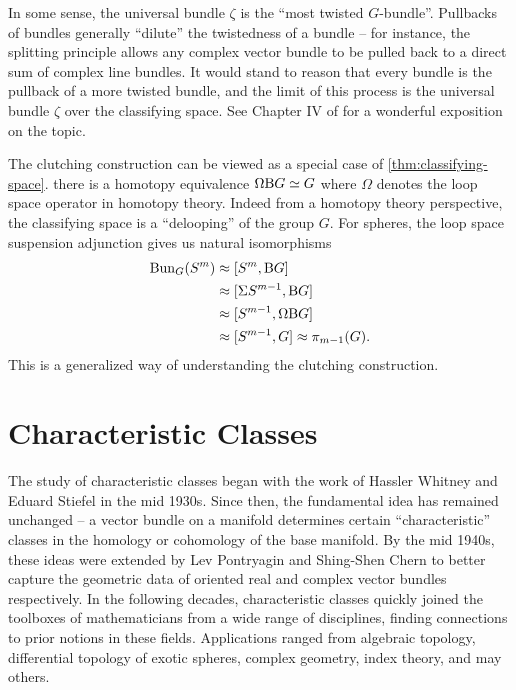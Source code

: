 	In some sense, the universal bundle $\zeta$ is the ``most twisted $G$-bundle''. Pullbacks of bundles generally ``dilute'' the twistedness of a bundle -- for instance, the splitting principle allows any complex vector bundle to be pulled back to a direct sum of complex line bundles. It would stand to reason that every bundle is the pullback of a more twisted bundle, and the limit of this process is the universal bundle $\zeta$ over the classifying space. See Chapter IV of \cite{botttu1982differential} for a wonderful exposition on the topic.


	\begin{remark}\label{rmk:clutching-construction-generalization}
	The clutching construction can be viewed as a special case of \cref{thm:classifying-space}.
	 there is a homotopy equivalence $\Omega \mathrm{B} G \simeq G$ where $\Omega$ denotes the loop space operator in homotopy theory. Indeed from a homotopy theory perspective, the classifying space is a ``delooping'' of the group $G$. For spheres, the loop space suspension adjunction gives us natural isomorphisms
	\[
		\begin{aligned}
			\operatorname{Bun}_{G}(S^m) & \approx [S^m, \mathrm{B} G]            \\
			              & \approx [\Sigma S^{m-1}, \mathrm{B} G] \\
			              & \approx [S^{m-1}, \Omega\mathrm{B} G]  \\
			              & \approx [S^{m-1}, G]
			\approx \pi_{m-1}(G).
		\end{aligned}
	\]
	This is a generalized way of understanding the clutching construction.
\end{remark}

\pagebreak
\section{Characteristic Classes}
The study of characteristic classes began with the work of Hassler Whitney and Eduard Stiefel in the mid 1930s. Since then, the fundamental idea has remained unchanged -- a vector bundle on a manifold determines certain ``characteristic'' classes in the homology or cohomology of the base manifold.
By the mid 1940s, these ideas were extended by Lev Pontryagin and Shing-Shen Chern to better capture the geometric data of oriented real and complex vector bundles respectively. In the following decades, characteristic classes quickly joined the toolboxes of mathematicians from a wide range of disciplines, finding connections to prior notions in these fields.
Applications ranged from algebraic topology, differential topology of exotic spheres, complex geometry, index theory, and may others.

